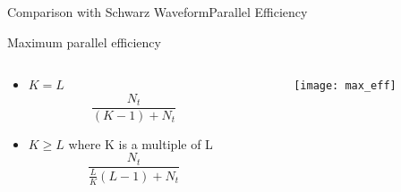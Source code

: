 \documentclass[]{beamer}
\begin{document}
\begin{frame}{Comparison with Schwarz Waveform}{Parallel Efficiency}

  Maximum parallel efficiency
  \begin{columns}
    
    \begin{column}{.4\textwidth}

      \begin{itemize}
      \item $K=L$
        \[ \frac{N_t}{(K-1) + N_t} \]

      \item $K \geq L$ where K is a multiple of L
        \[ \frac{N_t}{\frac{L}{K}(L-1)+ N_t} \]
      \end{itemize}
    \end{column}

    \begin{column}{.8\textwidth}
      
      \begin{figure}[]
        \centering
        \texttt{[image: max\_eff]}
      \end{figure}

    \end{column}

  \end{columns}

\end{frame}
\end{document}
